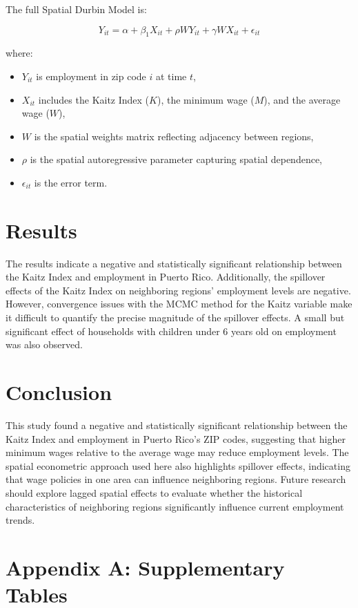\documentclass[12pt]{article}
\begin{document}
The full Spatial Durbin Model is:

\[
	Y_{it} = \alpha + \beta_1 X_{it} + \rho W Y_{it} + \gamma W X_{it} + \epsilon_{it}
\]

where:
\begin{itemize}
	\item $Y_{it}$ is employment in zip code $i$ at time $t$,
	\item $X_{it}$ includes the Kaitz Index ($K$), the minimum wage ($M$), and the average wage ($W$),
	\item $W$ is the spatial weights matrix reflecting adjacency between regions,
	\item $\rho$ is the spatial autoregressive parameter capturing spatial dependence,
	\item $\epsilon_{it}$ is the error term.
\end{itemize}

\section{Results}

The results indicate a negative and statistically significant relationship between the Kaitz
Index and employment in Puerto Rico. Additionally, the spillover effects of the Kaitz
Index on neighboring regions’ employment levels are negative. However, convergence issues
with the MCMC method for the Kaitz variable make it difficult to quantify the precise
magnitude of the spillover effects. A small but significant effect of households
with children under 6 years old on employment was also observed.

\section{Conclusion}

This study found a negative and statistically significant relationship between the Kaitz Index
and employment in Puerto Rico's ZIP codes, suggesting that higher minimum wages relative to the
average wage may reduce employment levels. The spatial econometric approach used here also
highlights spillover effects, indicating that wage policies in one area can influence neighboring
regions. Future research should explore lagged spatial effects to evaluate whether the historical
characteristics of neighboring regions significantly influence current employment trends.

\printbibliography

\appendix
\section*{Appendix A: Supplementary Tables}
\setcounter{table}{0} %
\renewcommand{\thetable}{A\arabic{table}} %
\end{document}
